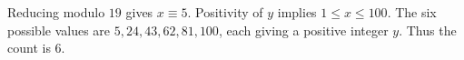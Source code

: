 Reducing modulo $19$ gives $x\equiv5$. Positivity of $y$ implies $1\le x\le100$. The six possible values are $5,24,43,62,81,100$, each giving a positive integer $y$. Thus the count is $\boxed6$.
